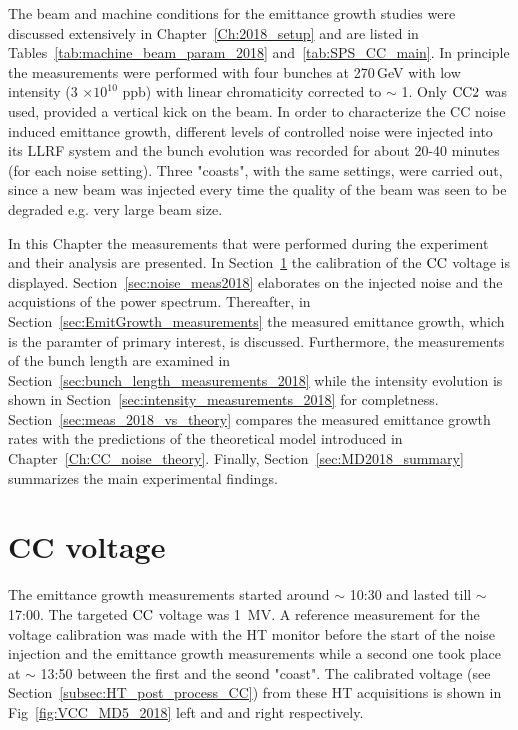 \vspace*{-1mm}
The beam and machine conditions for the emittance growth studies were discussed extensively in Chapter~\ref{Ch:2018_setup} and are listed in Tables~\ref{tab:machine_beam_param_2018} and~\ref{tab:SPS_CC_main}. In principle the measurements were performed with four bunches at 270\,GeV with low intensity (3 $\times \mathrm{10^{10}}$ ppb) with linear chromaticity corrected to $\sim$ 1. Only ${\mathrm{CC}}2$ was used, provided a vertical kick on the beam. In order to characterize the CC noise induced emittance growth, different levels of controlled noise were injected into its LLRF system and the bunch evolution was recorded for about 20-40 minutes (for each noise setting). Three "coasts", with the same settings, were carried out, since a new beam was injected every time the quality of the beam was seen to be degraded e.g.  very large beam size.

In this Chapter the measurements that were performed during the experiment and their analysis are presented. In Section~\ref{sec:CC_voltage_meas2018} the calibration of the ${\mathrm{CC}}$ voltage is displayed. Section~\ref{sec:noise_meas2018} elaborates on the injected noise and the acquistions of the power spectrum. Thereafter, in Section~\ref{sec:EmitGrowth_measurements} the measured emittance growth, which is the paramter of primary interest, is discussed. Furthermore, the measurements of the bunch length are examined in Section~\ref{sec:bunch_length_measurements_2018} while the intensity evolution is shown in Section~\ref{sec:intensity_measurements_2018} for completness. Section~\ref{sec:meas_2018_vs_theory} compares the measured emittance growth rates with the predictions of the theoretical model introduced in Chapter~\ref{Ch:CC_noise_theory}. Finally, Section~\ref{sec:MD2018_summary} summarizes the main experimental findings.


\section{CC voltage}\label{sec:CC_voltage_meas2018}

The emittance growth measurements started around $\sim$ 10:30 and lasted till $\sim$ 17:00. The targeted ${\mathrm{CC}}$ voltage was 1\, MV. A reference measurement for the voltage calibration was made with the HT monitor before the start of the noise injection and the emittance growth measurements while a second one took place at $\sim$ 13:50 between the first and the seond "coast". The calibrated voltage (see Section~\ref{subsec:HT_post_process_CC}) from these HT acquisitions is shown in Fig~\ref{fig:VCC_MD5_2018} left and and right respectively.

